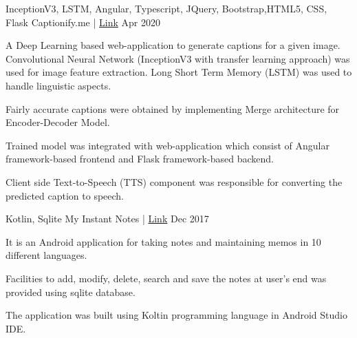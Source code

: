 

\begin{cventries}
\cventry
    {\textnormal{InceptionV3, LSTM, Angular, Typescript, JQuery, Bootstrap,HTML5, CSS, Flask}} %
    {Captionify.me | \href{https://github.com/Rpmalukani22/Automatic-Image-Caption-Generator}{ Link}} %
    { } %
    {Apr 2020} %
    {
      \begin{cvitems} %
        \item {A Deep Learning based web-application to generate captions for a given image. Convolutional Neural Network (InceptionV3 with transfer learning approach) was used for image feature extraction. Long Short Term Memory (LSTM) was used to handle linguistic aspects.}
        \item{Fairly accurate captions were obtained by implementing Merge architecture for Encoder-Decoder Model.}
        \item {Trained model was integrated with web-application which consist of Angular framework-based frontend and Flask framework-based backend.}
        \item{ Client side Text-to-Speech (TTS) component was responsible for converting the predicted caption to speech.}
        \end{cvitems}
    }
  \cventry
    {\textnormal{Kotlin, Sqlite}} %
    {My Instant Notes | \href{https://play.google.com/store/apps/details?id=dropdwn.ruchitesh.com.notes}{ Link}} %
    { } %
    {Dec 2017} %
    {
      \begin{cvitems} %
        \item {It is an Android application for taking notes and maintaining memos in 10 different languages.}
        \item{Facilities to add, modify, delete, search and save the notes at user's end was provided using sqlite database.}
        \item{The application was built using Koltin programming language in Android Studio IDE.}

\end{cvitems}}
\end{cventries}
